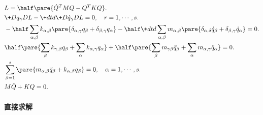 \documentclass{ctexart}
\begin{document}
\begin{align*}
    &L = \half \pare{\dot{Q}^T MQ - Q^TKQ}. \\
    &\+D{q_\gamma}DL - \+dtd{} \+D{\dot{q}_\gamma}DL = 0,\quad r = 1,\cdots, s. \\
    & -\half \sum_{\alpha,\beta} k_{\alpha,\beta} \pare{\delta_{\alpha,\gamma}q_\beta + \delta_{\beta,\gamma} q_\alpha} - \half \+dtd{} \sum_{\alpha,\beta} m_{\alpha,\beta} \pare{\delta_{\alpha,\delta} \dot{q}_\beta + \delta_{\beta,\gamma}\dot{q}_\alpha} = 0. \\
    & \half\pare{\sum_\beta k_{\gamma,\beta} q_\beta + \sum_\alpha k_{\alpha,\gamma}q_\alpha} + \half\pare{\sum_\beta m_{\gamma\beta}\ddot{q}_\beta + \sum_\alpha m_{\alpha,\gamma}\ddot{q}_\alpha} = 0.\\
    & \sum_{\beta=1}^s \pare{m_{\alpha,\beta}\ddot{q}_\beta + k_{\alpha,\beta}q_\beta} = 0,\quad \alpha = 1,\cdots, s. \\
    & M\ddot{Q} + KQ = 0.
\end{align*}

\paragraph{直接求解} %
\label{par:直接求解}
\end{document}
